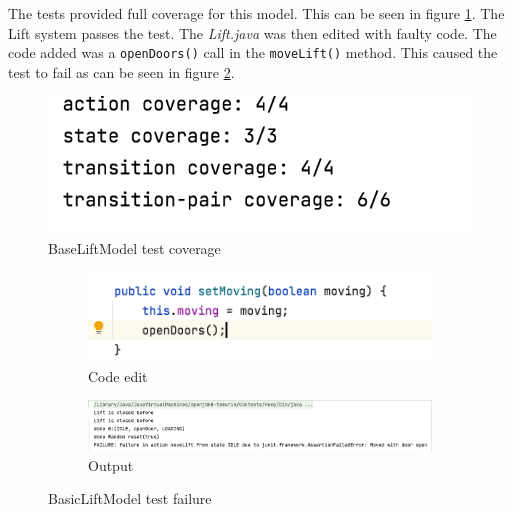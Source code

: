 \documentclass[a4paper, 12pt]{article}
\begin{document}
The tests provided full coverage for this model. This can be seen in figure \ref{fig:BaseLiftModel-coverage}. The Lift system passes the test. The \textit{Lift.java} was then edited with faulty code. The code added was a \texttt{openDoors()} call in the \texttt{moveLift()} method. This caused the test to fail as can be seen in figure \ref{fig:BasicLiftModel-fail}. \\

\begin{figure}[h]
   \centering
   \includegraphics[width=\textwidth,height=\textheight,keepaspectratio]{images/BaseLiftModel-coverage} %
   \caption{BaseLiftModel test coverage}
   \label{fig:BaseLiftModel-coverage}
\end{figure}

\begin{figure}[h]
\centering
\begin{subfigure}{.5\textwidth}
  \centering
  \includegraphics[width=\linewidth]{images/BasicLiftModel-fail-code}
  \caption{Code edit}
\end{subfigure}%
\begin{subfigure}{.5\textwidth}
  \centering
  \includegraphics[width=\linewidth]{images/BasicLiftModel-fail-output}
  \caption{Output}
\end{subfigure}
\caption{BasicLiftModel test failure}
\label{fig:BasicLiftModel-fail}
\end{figure}
\end{document}
